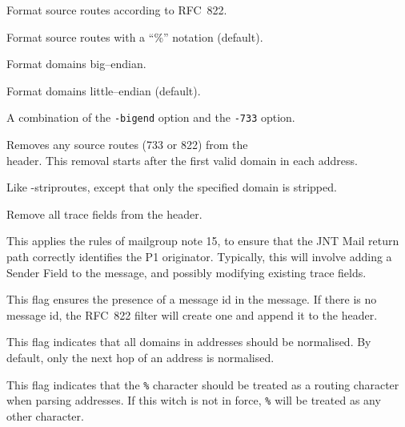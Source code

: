 \begin{describe}

\item[\verb+-822+:] Format source routes according to RFC~822.

\item[\verb+-733+:] Format source routes with a ``\%'' notation (default).

\item[\verb+-bigend+:] Format domains big--endian.

\item[\verb+-littleend+:] Format domains little--endian (default).

\item[\verb+-jnt+:] A combination of the \verb+-bigend+ option and the
\verb+-733+ option.

\item[\verb+-striproutes+:] Removes any source routes (733 or 822)
from the \\
header. This removal starts after the first valid domain in each address.

\item[\verb+-stripdomain <domain>+:] Like -striproutes, except that only the
specified domain is stripped.

\item[\verb+-striptrace+:] Remove all trace fields from the header.

\item[\verb+-jntsender <sender>+:] This applies the rules of mailgroup note 15,
to ensure that the JNT Mail return path correctly identifies the P1 originator.
Typically, this will involve adding a Sender Field to the message, and
possibly modifying existing trace fields.

\item[\verb+-msgid+:] This flag ensures the presence of a message id in
the message.
If there is no message id, the RFC~822 filter will create one and
append it to the header.

\item[\verb+-full+:] This flag indicates that all domains in addresses
should be normalised. By default, only the next hop of an address is
normalised.

\item[\verb+-percent+:] This flag indicates that the \verb+%+
character should be treated as a routing character when parsing
addresses. If this witch is not in force, \verb|%| will be treated as 
any other character.


\end{describe}
